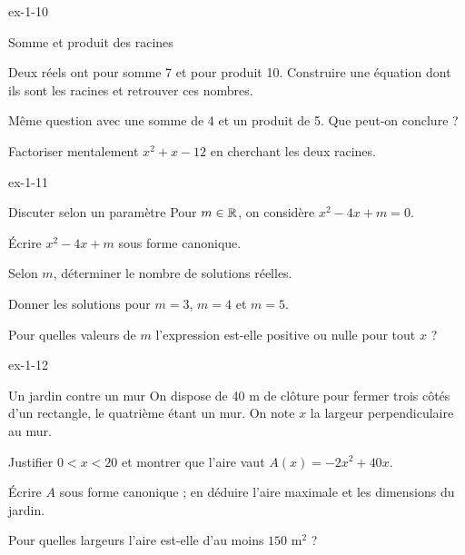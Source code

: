 \begin{blocLivre}{ex-1-10}
\begin{exercice}[2]{Somme et produit des racines}
\begin{questions}
\item Deux réels ont pour somme 7 et pour produit 10. Construire une équation
dont ils sont les racines et retrouver ces nombres.
\item Même question avec une somme de 4 et un produit de 5. Que peut-on conclure ?
\item Factoriser mentalement $x^2+x-12$ en cherchant les deux racines.
\end{questions}
\end{exercice}
\end{blocLivre}
\begin{blocLivre}{ex-1-11}
\begin{exercice}[2]{Discuter selon un paramètre}
Pour $m\in\mathbb{R}$, on considère $x^2-4x+m=0$.
\begin{questions}
\item Écrire $x^2-4x+m$ sous forme canonique.
\item Selon $m$, déterminer le nombre de solutions réelles.
\item Donner les solutions pour $m=3$, $m=4$ et $m=5$.
\item Pour quelles valeurs de $m$ l'expression est-elle positive ou nulle pour tout $x$ ?
\end{questions}
\end{exercice}
\end{blocLivre}
\clearpage
{}
\begin{blocLivre}{ex-1-12}
\begin{exercice}[3]{Un jardin contre un mur}
On dispose de 40 m de clôture pour fermer trois côtés d'un rectangle,
le quatrième étant un mur. On note $x$ la largeur perpendiculaire au mur.
\begin{center}\par{}\end{center}
\begin{questions}
\item Justifier $0<x<20$ et montrer que l'aire vaut $A(x)=-2x^2+40x$.
\item Écrire $A$ sous forme canonique ; en déduire l'aire maximale et les dimensions du jardin.
\item Pour quelles largeurs l'aire est-elle d'au moins $150$ m$^2$ ?
\end{questions}
\end{exercice}
\end{blocLivre}
